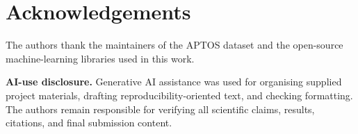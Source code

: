 \documentclass[11pt,a4paper]{article}
\begin{document}
\section*{Acknowledgements}
The authors thank the maintainers of the APTOS dataset and the open-source machine-learning libraries used in this work.\par
\textbf{AI-use disclosure.} Generative AI assistance was used for organising supplied project materials, drafting reproducibility-oriented text, and checking formatting. The authors remain responsible for verifying all scientific claims, results, citations, and final submission content.



\end{document}
